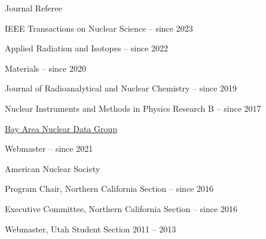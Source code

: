 \begin{list1}
\item[] Journal Referee
\begin{list2}
\item IEEE Transactions on Nuclear Science \hfill{ -- since 2023}
\item Applied Radiation and Isotopes \hfill{ -- since 2022}
\item Materials \hfill{ -- since 2020}
\item Journal of Radioanalytical and Nuclear Chemistry \hfill{ -- since 2019}
\item Nuclear Instruments and Methods in Physics Research B   \hfill{ -- since 2017}
\end{list2}
\item[] \href{https://nucleardata.berkeley.edu/}{Bay Area Nuclear Data Group}
\begin{list2}
\item Webmaster   \hfill{ -- since 2021}
\end{list2}
\item[] American Nuclear Society  
\begin{list2}
\item Program Chair, Northern California Section \hfill{ -- since 2016}
\item Executive Committee, Northern California Section \hfill{ -- since 2016}
\item Webmaster, Utah Student Section \hfill{2011 --  2013}
\end{list2}
\end{list1}
